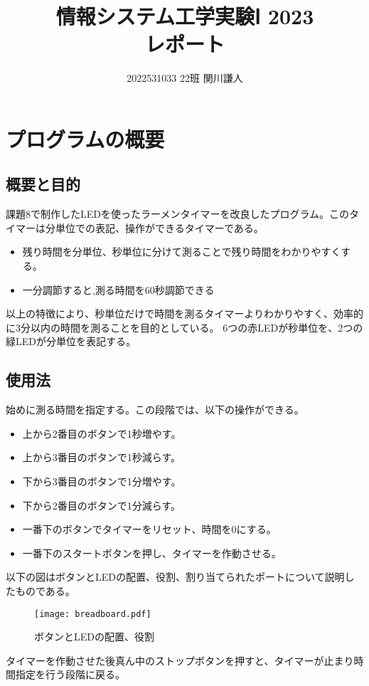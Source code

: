 \documentclass[a4paper,titlepage,11pt]{ltjsarticle}
\begin{document}
\title{情報システム工学実験Ⅰ 2023\\レポート}
\author{2022531033 22班 関川謙人}
\maketitle
\section{プログラムの概要}
\subsection{概要と目的}
課題8で制作したLEDを使ったラーメンタイマーを改良したプログラム。このタイマーは分単位での表記、操作ができるタイマーである。
\begin{itemize}
  \item 残り時間を分単位、秒単位に分けて測ることで残り時間をわかりやすくする。
  \item 一分調節すると,測る時間を60秒調節できる
\end{itemize}
以上の特徴により、秒単位だけで時間を測るタイマーよりわかりやすく、効率的に3分以内の時間を測ることを目的としている。
6つの赤LEDが秒単位を、2つの緑LEDが分単位を表記する。
\subsection{使用法}
始めに測る時間を指定する。この段階では、以下の操作ができる。
\begin{itemize}
  \item 上から2番目のボタンで1秒増やす。
  \item 上から3番目のボタンで1秒減らす。
  \item 下から3番目のボタンで1分増やす。
  \item 下から2番目のボタンで1分減らす。
  \item 一番下のボタンでタイマーをリセット、時間を0にする。
  \item 一番下のスタートボタンを押し、タイマーを作動させる。
\end{itemize}
以下の図はボタンとLEDの配置、役割、割り当てられたポートについて説明したものである。
\begin{figure}[H]
  \begin{center}
    \texttt{[image: breadboard.pdf]}
    \caption{ボタンとLEDの配置、役割}
  \end{center}
  \end{figure}

タイマーを作動させた後真ん中のストップボタンを押すと、タイマーが止まり時間指定を行う段階に戻る。
\end{document}
